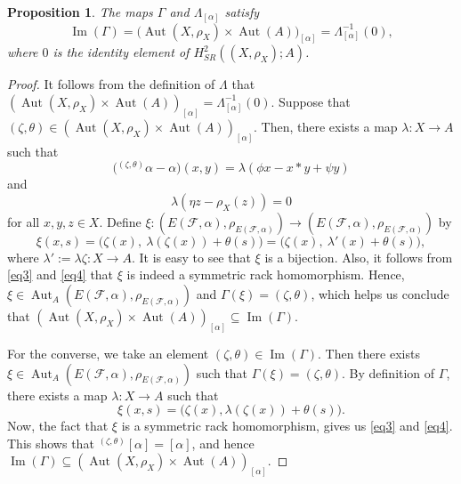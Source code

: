 \documentclass[11pt,reqno]{amsart}
\newtheorem{proposition}[theorem]{Proposition}
\theoremstyle{definition}
\numberwithin{equation}{subsection}
\begin{document}
\begin{proposition}
The maps $\Gamma$  and $\Lambda_{[\alpha]}$ satisfy 
$$\operatorname{Im}(\Gamma)=\big(\operatorname{Aut}(X, \rho_{X}) \times\operatorname{Aut}(A)\big)_{[\alpha]}=\Lambda_{[\alpha]}^{-1}(0),$$ where $0$ is the identity element of $H_{SR}^{2}((X,\rho_{X});A)$.
\end{proposition}

\begin{proof}
It follows from the definition of $\Lambda$ that $(\operatorname{Aut}(X, \rho_{X}) \times\operatorname{Aut}(A))_{[\alpha]}=\Lambda_{[\alpha]}^{-1}(0)$. Suppose that $(\zeta,\theta)\in(\operatorname{Aut}(X, \rho_{X}) \times\operatorname{Aut}(A))_{[\alpha]}$. Then, there exists a map $\lambda: X \longrightarrow A$ such that
	\begin{equation}
		\big({}^{(\zeta,\theta)}\alpha-\alpha \big)(x, y)=\lambda(\phi x-x *y+\psi y)
		\label{eq3}
	\end{equation}	
and
	\begin{equation}
		\lambda(\eta z-\rho_{X}(z))=0
		\label{eq4}
	\end{equation}
for all $x, y, z \in X$. Define $\xi: (E(\mathcal{F}, \alpha),\rho_{E(\mathcal{F}, \alpha)}) \longrightarrow(E(\mathcal{F}, \alpha),\rho_{E(\mathcal{F}, \alpha)})$ by
$$
\xi(x,s)=\big(\zeta(x),~\lambda(\zeta(x))+\theta(s)\big) =\big(\zeta(x),~\lambda'(x)+\theta(s)\big), 
$$
where $\lambda' :=\lambda \zeta: X \longrightarrow A.$	It is easy to see that $\xi$ is a bijection. Also, it follows from \eqref{eq3} and \eqref{eq4} that $\xi$ is indeed a symmetric rack homomorphism. Hence,  $\xi\in \operatorname{Aut}_{A}(E(\mathcal{F}, \alpha),\rho_{E(\mathcal{F}, \alpha)})$ and $\Gamma(\xi)=(\zeta,\theta)$, which helps us conclude that $(\operatorname{Aut}(X, \rho_{X}) \times\operatorname{Aut}(A))_{[\alpha]}\subseteq \operatorname{Im}(\Gamma)$.
\par

For the converse, we take an element $(\zeta,\theta)\in \operatorname{Im}(\Gamma).$ Then there exists $\xi \in \operatorname{Aut}_{A}(E(\mathcal{F}, \alpha),\rho_{E(\mathcal{F}, \alpha)})$ such that $\Gamma(\xi)=(\zeta,\theta)$. By definition of $\Gamma$,  there exists a map  $\lambda: X \longrightarrow A$ such that 
$$\xi(x,s)=\big(\zeta(x),\lambda(\zeta(x))+\theta(s)\big).$$ Now, the fact that $\xi$ is a symmetric rack homomorphism, gives us \eqref{eq3} and \eqref{eq4}. This shows that ${}^{(\zeta,\theta)}[\alpha]=[\alpha]$, and hence $ \operatorname{Im}(\Gamma)\subseteq (\operatorname{Aut}(X, \rho_{X}) \times\operatorname{Aut}(A))_{[\alpha]}$.
\end{proof}
\end{document}
